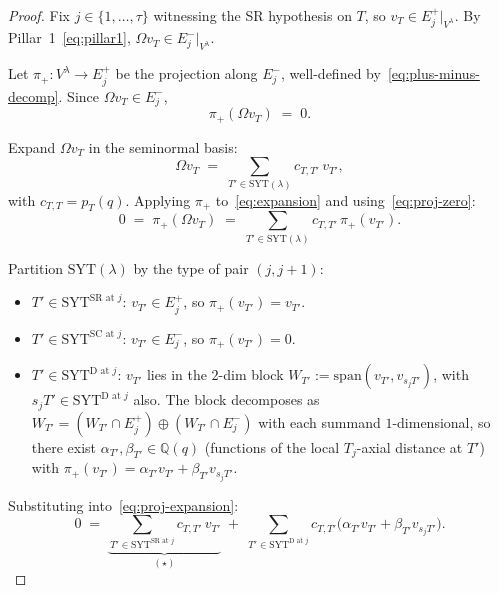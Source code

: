 \documentclass[11pt]{article}
\theoremstyle{definition}
\newcommand{\Vlam}{V^\lambda}
\newcommand{\Om}{\Omega}
\newcommand{\SYT}{\mathrm{SYT}}
\newcommand{\Eplus}{E^+}
\newcommand{\Eminus}{E^-}
\newcommand{\pT}{p_T}
\begin{document}
\begin{proof}
Fix $j \in \{1, \ldots, \tau\}$ witnessing the SR hypothesis on $T$, so
$v_T \in \Eplus_j|_{\Vlam}$. By Pillar~1~\eqref{eq:pillar1}, $\Om v_T \in
\Eminus_j|_{\Vlam}$.

Let $\pi_+: \Vlam \to \Eplus_j$ be the projection along $\Eminus_j$,
well-defined by~\eqref{eq:plus-minus-decomp}. Since $\Om v_T \in \Eminus_j$,
\begin{equation}\label{eq:proj-zero}
   \pi_+(\Om v_T) \;=\; 0.
\end{equation}

Expand $\Om v_T$ in the seminormal basis:
\begin{equation}\label{eq:expansion}
   \Om v_T \;=\; \sum_{T' \in \SYT(\lambda)} c_{T, T'} \, v_{T'},
\end{equation}
with $c_{T, T} = \pT(q)$. Applying $\pi_+$ to~\eqref{eq:expansion} and
using~\eqref{eq:proj-zero}:
\begin{equation}\label{eq:proj-expansion}
   0 \;=\; \pi_+(\Om v_T) \;=\; \sum_{T' \in \SYT(\lambda)} c_{T, T'} \, \pi_+(v_{T'}).
\end{equation}

Partition $\SYT(\lambda)$ by the type of pair $(j, j+1)$:
\begin{itemize}[topsep=0.2em,itemsep=0.1em]
\item $T' \in \SYT^{\mathrm{SR}\text{ at }j}$: $v_{T'} \in \Eplus_j$, so
   $\pi_+(v_{T'}) = v_{T'}$.
\item $T' \in \SYT^{\mathrm{SC}\text{ at }j}$: $v_{T'} \in \Eminus_j$, so
   $\pi_+(v_{T'}) = 0$.
\item $T' \in \SYT^{\mathrm{D}\text{ at }j}$: $v_{T'}$ lies in the $2$-dim
   block $W_{T'} := \mathrm{span}(v_{T'}, v_{s_j T'})$, with $s_j T' \in
   \SYT^{\mathrm{D}\text{ at }j}$ also. The block decomposes as
   $W_{T'} = (W_{T'} \cap \Eplus_j) \oplus (W_{T'} \cap \Eminus_j)$ with
   each summand $1$-dimensional, so there exist $\alpha_{T'}, \beta_{T'} \in
   \mathbb{Q}(q)$ (functions of the local $T_j$-axial distance at $T'$) with
   $\pi_+(v_{T'}) = \alpha_{T'} v_{T'} + \beta_{T'} v_{s_j T'}$.
\end{itemize}

Substituting into~\eqref{eq:proj-expansion}:
\begin{equation}\label{eq:proj-expanded}
   0
   \;=\; \underbrace{\sum_{T' \in \SYT^{\mathrm{SR}\text{ at }j}} c_{T, T'}\, v_{T'}}_{(\star)}
   \;+\; \sum_{T' \in \SYT^{\mathrm{D}\text{ at }j}} c_{T, T'} \bigl(\alpha_{T'} v_{T'} + \beta_{T'} v_{s_j T'}\bigr).
\end{equation}


\end{proof}
\end{document}
